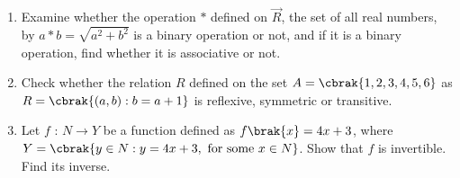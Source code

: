 \begin{enumerate}

\item Examine whether the operation $*$ defined on $\vec{R}$, the set of all real numbers, by $a * b = \sqrt{a^2+b^2}$ is a binary operation or not, and if it is a binary operation, find whether it is associative or not.
\item Check whether the relation $R$ defined on the set $A=\cbrak{1,2,3,4,5,6}$ as $R =\cbrak {(a, b) : b = a + 1}$ is reflexive, symmetric or transitive.
\item Let $f$ : $N\rightarrow Y $ be a function defined as $f\brak{x}= 4x + 3$, where $Y=\cbrak{y\in N:y=4x+3, \text{ for some } x\in N}$. Show that $f$ is invertible. Find its inverse.

\end{enumerate}
